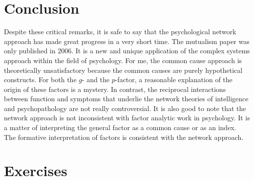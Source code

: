 \documentclass[
  a4paper,
  DIV=11,
  numbers=noendperiod]{scrreprt}
\begin{document}
\hypertarget{sec-Conclusion}{%
\section{Conclusion}\label{sec-Conclusion}}

Despite these critical remarks, it is safe to say that the psychological
network approach has made great progress in a very short time. The
mutualism paper was only published in 2006. It is a new and unique
application of the complex systems approach within the field of
psychology. For me, the common cause approach is theoretically
unsatisfactory because the common causes are purely hypothetical
constructs. For both the \(g\)- and the \(p\)-factor, a reasonable
explanation of the origin of these factors is a mystery. In contrast,
the reciprocal interactions between function and symptoms that underlie
the network theories of intelligence and psychopathology are not really
controversial. It is also good to note that the network approach is not
inconsistent with factor analytic work in psychology. It is a matter of
interpreting the general factor as a common cause or as an index. The
formative interpretation of factors is consistent with the network
approach.

\hypertarget{sec-Exercises}{%
\section{Exercises}\label{sec-Exercises}}
\end{document}
